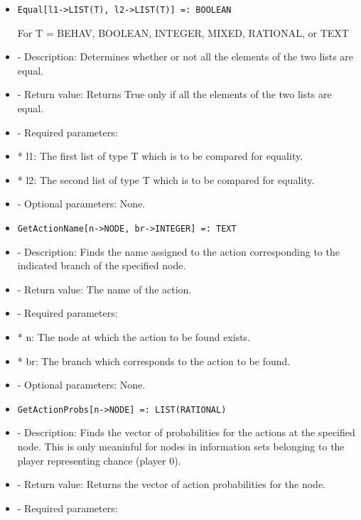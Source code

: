 \begin{itemize}
\item
\begin{verbatim}
Equal[l1->LIST(T), l2->LIST(T)] =: BOOLEAN
\end{verbatim}

	For T = BEHAV, BOOLEAN, INTEGER, MIXED, RATIONAL, or TEXT

\bd
\item
- Description:  Determines whether or not all the elements of the two
lists are equal.
\item
- Return value:  Returns True only if all the elements of the two lists
are equal.
\item
- Required parameters:  
	
\bd
\item
*  l1:  The first list of type T which is to be compared for equality.
\item
*  l2:  The second list of type T which is to be compared for 
equality.
\ed

\item
- Optional parameters:  None.

\ed

\item
\begin{verbatim}
GetActionName[n->NODE, br->INTEGER] =: TEXT
\end{verbatim}

\bd
\item
- Description:  Finds the name assigned to the action corresponding to 
the indicated branch of the specified node.
\item   
- Return value:  The name of the action.
\item
- Required parameters:
	
\bd
\item
*  n:  The node at which the action to be found exists.
\item
*  br:  The branch which corresponds to the action to be found.
\ed

\item
- Optional parameters:  None.
\ed

\item
\begin{verbatim}
GetActionProbs[n->NODE] =: LIST(RATIONAL)
\end{verbatim}

\bd
\item
- Description:  Finds the vector of probabilities for the actions at the
specified node.  This is only meaninful for nodes in information sets 
belonging to the player representing chance (player 0).
\item
- Return value:  Returns the vector of action probabilities for the node.
\item
- Required parameters: 
	

\end{itemize}
